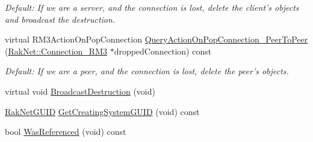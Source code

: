 \begin{DoxyCompactItemize}
\begin{DoxyCompactList}\small\item\em Default\-: If we are a server, and the connection is lost, delete the client's objects and broadcast the destruction. \end{DoxyCompactList}\item 
\hypertarget{class_rak_net_1_1_replica3_adfc92444727b42175cba755a63c9b94b}{virtual R\-M3\-Action\-On\-Pop\-Connection \hyperlink{class_rak_net_1_1_replica3_adfc92444727b42175cba755a63c9b94b}{Query\-Action\-On\-Pop\-Connection\-\_\-\-Peer\-To\-Peer} (\hyperlink{class_rak_net_1_1_connection___r_m3}{Rak\-Net\-::\-Connection\-\_\-\-R\-M3} $\ast$dropped\-Connection) const }\label{class_rak_net_1_1_replica3_adfc92444727b42175cba755a63c9b94b}

\begin{DoxyCompactList}\small\item\em Default\-: If we are a peer, and the connection is lost, delete the peer's objects. \end{DoxyCompactList}\item 
virtual void \hyperlink{class_rak_net_1_1_replica3_a7c6a22d575326cddec3a70eb1c2568f2}{Broadcast\-Destruction} (void)
\item 
\hyperlink{struct_rak_net_1_1_rak_net_g_u_i_d}{Rak\-Net\-G\-U\-I\-D} \hyperlink{class_rak_net_1_1_replica3_ada38ca6f642e7fd0b014cbf9d983e31a}{Get\-Creating\-System\-G\-U\-I\-D} (void) const 
\item 
bool \hyperlink{class_rak_net_1_1_replica3_a80c1541b6b76ad0c5513e45c1fbb1bdd}{Was\-Referenced} (void) const 
\end{DoxyCompactItemize}
